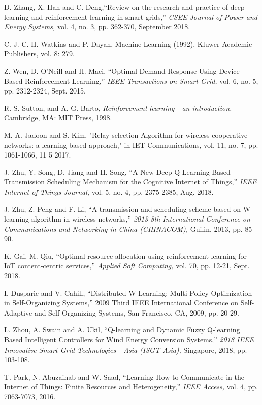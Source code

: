 \documentclass[journal]{IEEEtran}
\begin{document}
\begin{thebibliography}{1}
D. Zhang, X. Han and C. Deng,``Review on the research and practice of deep learning and reinforcement learning in smart grids,'' \emph{CSEE Journal of Power and Energy Systems,} vol. 4, no. 3, pp. 362-370, September 2018.

C. J. C. H. Watkins and P. Dayan, Machine Learning (1992), Kluwer Academic Publishers, vol. 8: 279.

Z. Wen, D. O'Neill and H. Maei, ``Optimal Demand Response Using Device-Based Reinforcement Learning,'' \emph{IEEE Transactions on Smart Grid,} vol. 6, no. 5, pp. 2312-2324, Sept. 2015.

R. S. Sutton, and A. G. Barto, \emph{Reinforcement learning - an introduction.} Cambridge, MA: MIT Press, 1998.

M. A. Jadoon and S. Kim, "Relay selection Algorithm for wireless cooperative networks: a learning-based approach," in IET Communications, vol. 11, no. 7, pp. 1061-1066, 11 5 2017.

J. Zhu, Y. Song, D. Jiang and H. Song, ``A New Deep-Q-Learning-Based Transmission Scheduling Mechanism for the Cognitive Internet of Things,'' \emph{IEEE Internet of Things Journal,} vol. 5, no. 4, pp. 2375-2385, Aug. 2018.

J. Zhu, Z. Peng and F. Li, ``A transmission and scheduling scheme based on W-learning algorithm in wireless networks,'' \emph{2013 8th International Conference on Communications and Networking in China (CHINACOM),} Guilin, 2013, pp. 85-90.

K. Gai, M. Qiu, ``Optimal resource allocation using reinforcement learning for IoT content-centric services,'' \emph{Applied Soft Computing,} vol. 70,
pp. 12-21, Sept. 2018.

I. Dusparic and V. Cahill, ``Distributed W-Learning: Multi-Policy Optimization in Self-Organizing Systems,'' 2009 Third IEEE International Conference on Self-Adaptive and Self-Organizing Systems, San Francisco, CA, 2009, pp. 20-29.

L. Zhou, A. Swain and A. Ukil, ``Q-learning and Dynamic Fuzzy Q-learning Based Intelligent Controllers for Wind Energy Conversion Systems,'' \emph{2018 IEEE Innovative Smart Grid Technologies - Asia (ISGT Asia),} Singapore, 2018, pp. 103-108.

T. Park, N. Abuzainab and W. Saad, ``Learning How to Communicate in the Internet of Things: Finite Resources and Heterogeneity,'' \emph{IEEE Access,} vol. 4, pp. 7063-7073, 2016.


\end{thebibliography}
\end{document}
